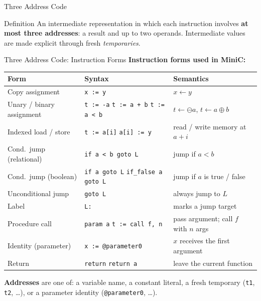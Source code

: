 \documentclass[aspectratio=169,11pt,xcolor=table]{beamer}
\newcommand{\tc}[1]{\texttt{#1}}
\begin{document}
\begin{frame}{Three Address Code}
  \begin{block}{Definition}
    An intermediate representation in which each instruction involves
    \textbf{at most three addresses}: a result and up to two operands.
    Intermediate values are made explicit through fresh \emph{temporaries}.
  \end{block}
\end{frame}

\begin{frame}{Three Address Code: Instruction Forms}
  \smallskip
  \textbf{Instruction forms used in MiniC:}
  \begin{center}
    \scriptsize
    \begin{tabular}{lll}
      \toprule
      \textbf{Form}                  & \textbf{Syntax}                    & \textbf{Semantics}                 \\
      \midrule
      Copy assignment                & \tc{x := y}                        & $x \leftarrow y$                   \\
      Unary / binary assignment      & \tc{t := -a} \quad \tc{t := a + b} \quad \tc{t := a < b} & $t \leftarrow \ominus a$, $t \leftarrow a \oplus b$ \\
      Indexed load / store           & \tc{t := a[i]} \quad \tc{a[i] := y} & read / write memory at $a + i$   \\
      Cond.\ jump (relational)       & \tc{if a < b goto L}               & jump if $a < b$                    \\
      Cond.\ jump (boolean)          & \tc{if a goto L} \quad \tc{if\_false a goto L} & jump if $a$ is true / false \\
      Unconditional jump             & \tc{goto L}                        & always jump to $L$                 \\
      Label                          & \tc{L:}                            & marks a jump target                \\
      Procedure call                 & \tc{param a} \quad \tc{t := call f, n} & pass argument; call $f$ with $n$ args \\
      Identity (parameter)           & \tc{x := @parameter0}              & $x$ receives the first argument    \\
      Return                         & \tc{return} \quad \tc{return a}    & leave the current function         \\
      \bottomrule
    \end{tabular}
  \end{center}

  \smallskip
  \textbf{Addresses} are one of: a variable name, a constant literal,
  a fresh temporary (\tc{t1}, \tc{t2}, \ldots), or a parameter identity
  (\tc{@parameter0}, \ldots).
\end{frame}
\end{document}
